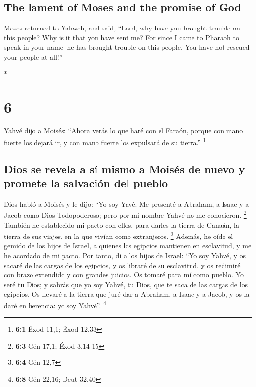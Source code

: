 \begin{paracol}{2}
\begin{otherlanguage}{english}
\hypertarget{the-lament-of-moses-and-the-promise-of-god}{%
\subsection{The lament of Moses and the promise of
God}\label{the-lament-of-moses-and-the-promise-of-god}}

 Moses returned to Yahweh, and said, ``Lord, why have you
brought trouble on this people? Why is it that you have sent me?
 For since I came to Pharaoh to speak in your name, he
has brought trouble on this people. You have not rescued your people at
all!''

\end{otherlanguage}

\switchcolumn[0]*

\hypertarget{section-10}{%
\section{6}\label{section-10}}

 Yahvé dijo a Moisés: ``Ahora verás lo que haré con el
Faraón, porque con mano fuerte los dejará ir, y con mano fuerte los
expulsará de su tierra.'' \footnote{\textbf{6:1} Éxod 11,1; Éxod 12,33}

\hypertarget{dios-se-revela-a-suxed-mismo-a-moisuxe9s-de-nuevo-y-promete-la-salvaciuxf3n-del-pueblo}{%
\subsection{Dios se revela a sí mismo a Moisés de nuevo y promete la
salvación del
pueblo}\label{dios-se-revela-a-suxed-mismo-a-moisuxe9s-de-nuevo-y-promete-la-salvaciuxf3n-del-pueblo}}

 Dios habló a Moisés y le dijo: ``Yo soy Yavé.
 Me presenté a Abraham, a Isaac y a Jacob como Dios
Todopoderoso; pero por mi nombre Yahvé no me conocieron. \footnote{\textbf{6:3}
  Gén 17,1; Éxod 3,14-15}  También he establecido mi pacto
con ellos, para darles la tierra de Canaán, la tierra de sus viajes, en
la que vivían como extranjeros. \footnote{\textbf{6:4} Gén 12,7}
 Además, he oído el gemido de los hijos de Israel, a
quienes los egipcios mantienen en esclavitud, y me he acordado de mi
pacto.  Por tanto, di a los hijos de Israel: ``Yo soy
Yahvé, y os sacaré de las cargas de los egipcios, y os libraré de su
esclavitud, y os redimiré con brazo extendido y con grandes juicios.
 Os tomaré para mí como pueblo. Yo seré tu Dios; y sabrás
que yo soy Yahvé, tu Dios, que te saca de las cargas de los egipcios.
 Os llevaré a la tierra que juré dar a Abraham, a Isaac y
a Jacob, y os la daré en herencia: yo soy Yahvé''. \footnote{\textbf{6:8}
  Gén 22,16; Deut 32,40}


\end{paracol}
